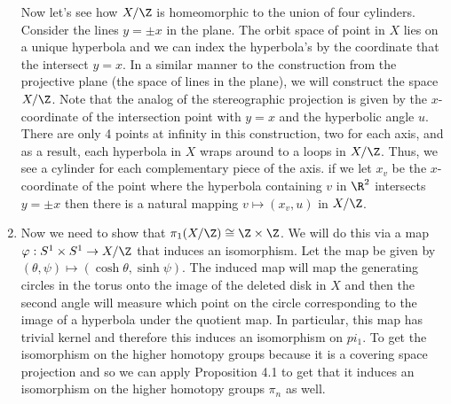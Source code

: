 \documentclass{article}
\begin{document}
\begin{solution}{0cm}
\begin{enumerate}
    Now let's see how $X/\Z$ is homeomorphic to the union of four
    cylinders. Consider the lines $y = \pm x$ in the plane. The orbit
    space of point in $X$ lies on a unique hyperbola and we can index
    the hyperbola's by the coordinate that the intersect $y=x$. In a
    similar manner to the construction from the projective plane (the
    space of lines in the plane), we will construct the space
    $X/\Z$. Note that the analog of the stereographic projection is
    given by the $x$-coordinate of the intersection point with $y=x$
    and the hyperbolic angle $u$. There are only 4 points at
    infinity in this construction, two for each axis, and as a result,
    each hyperbola in $X$ wraps around to a loops in $X/\Z$. Thus, we
    see a cylinder for each complementary piece of the axis. if we let
    $x_v$ be the $x$-coordinate of the point where the hyperbola
    containing $v$ in $\R^2$ intersects $y = \pm x$ then there is a
    natural mapping $v \mapsto (x_v, u)$ in $X/\Z$.
  \item Now we need to show that $\pi_1(X/\Z) \cong \Z \times \Z$. We
    will do this via a map $\varphi: S^1 \times S^1 \to X/\Z$ that
    induces an isomorphism. Let the map be given by $(\theta, \psi)
    \mapsto (\cosh\theta, \sinh\psi)$. The induced map will map the
    generating circles in the torus onto the image of the deleted disk
    in $X$ and then the second angle will measure which point on the
    circle corresponding to the image of a hyperbola under the
    quotient map. In particular, this map has trivial kernel and
    therefore this induces an isomorphism on $pi_1$. To get the
    isomorphism on the higher homotopy groups because it is a covering
    space projection and so we can apply Proposition 4.1 to get that
    it induces an isomorphism on the higher homotopy groups $\pi_n$ as
    well.
  \end{enumerate}
\end{solution}
\end{document}

